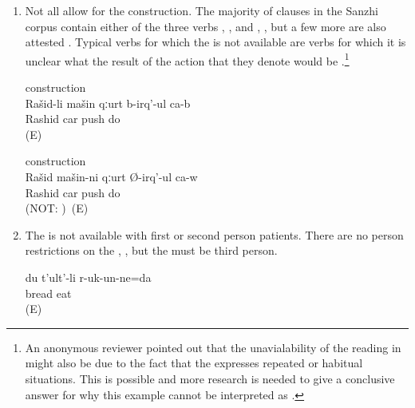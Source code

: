\begin{enumerate}
	\item	Not all  allow for the  construction. The majority of  clauses in the Sanzhi corpus contain either of the three verbs   ,   , and   , , but a few more are also attested . Typical verbs for which the  is not available are verbs for which it is unclear what the result of the action that they denote would be .\footnote{An anonymous reviewer pointed out that the unavialability of the  reading in  might also be due to the fact that the  expresses repeated or habitual situations. This is possible and more research is needed to give a conclusive answer for why this example cannot be interpreted as .} 
	\begin{exe}
		\ex	\label{ex:Rashid get away from the car@64}
		\begin{xlist}
			\ex	{} construction \label{ex:Rashid is pushing the car@64a} \\
			\gll	Rašid-li	mašin	qːurt	b-irq'-ul ca-b\\
				Rashid	car	push	do \\
			\glt	{} (E)
	
			\ex	{} construction \label{ex:The car is pushing Rashid@64b} \\
			\gll	Rašid	mašin-ni	qːurt	Ø-irq'-ul ca-w\\
				Rashid	car	push	do \\
			\glt	{} (NOT: )~(E)
		\end{xlist}
	\end{exe}

	\item	The  is not available with first or second person patients. There are no person restrictions on the  , , but the  must be third person.
	\begin{exe}
		\ex	\label{ex:I (fem.) am eating bread}
		\gll	du	t'ult'-li	r-uk-un-ne=da\\
				bread	eat\tsc{.ipfv-pret-cvb=1}\\
		\glt	\sqt{I (fem.) am eating bread.} (E)
	\end{exe}


\end{enumerate}
